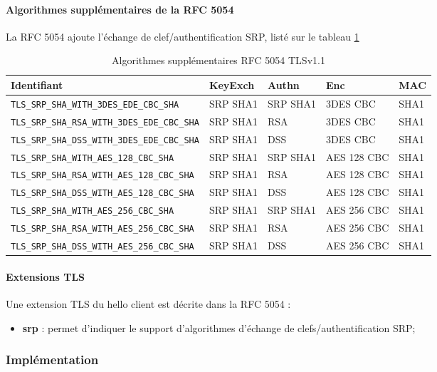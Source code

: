 \paragraph{Algorithmes supplémentaires de la RFC 5054} 
La RFC 5054 \cite{rfc5054} ajoute l'échange de clef/authentification SRP, listé sur le tableau \ref{algosTLS1.1RFC5054}

\begin{table}
\centering
\begin{tabularx}{17cm}{|l|l|l|X|l|}
\hline
\textbf{Identifiant} & \textbf{KeyExch} & \textbf{Authn}& \textbf{Enc}& \textbf{MAC}\\
\hline
\verb+TLS_SRP_SHA_WITH_3DES_EDE_CBC_SHA+&SRP SHA1&SRP SHA1&3DES CBC&SHA1\\
\hline
\verb+TLS_SRP_SHA_RSA_WITH_3DES_EDE_CBC_SHA+&SRP SHA1&RSA&3DES CBC&SHA1\\
\hline
\verb+TLS_SRP_SHA_DSS_WITH_3DES_EDE_CBC_SHA+&SRP SHA1&DSS&3DES CBC&SHA1\\
\hline
\verb+TLS_SRP_SHA_WITH_AES_128_CBC_SHA+&SRP SHA1&SRP SHA1&AES 128 CBC&SHA1\\
\hline
\verb+TLS_SRP_SHA_RSA_WITH_AES_128_CBC_SHA+&SRP SHA1&RSA&AES 128 CBC&SHA1\\
\hline
\verb+TLS_SRP_SHA_DSS_WITH_AES_128_CBC_SHA+&SRP SHA1&DSS&AES 128 CBC&SHA1\\
\hline
\verb+TLS_SRP_SHA_WITH_AES_256_CBC_SHA+&SRP SHA1&SRP SHA1&AES 256 CBC&SHA1\\
\hline
\verb+TLS_SRP_SHA_RSA_WITH_AES_256_CBC_SHA+&SRP SHA1&RSA&AES 256 CBC&SHA1\\
\hline
\verb+TLS_SRP_SHA_DSS_WITH_AES_256_CBC_SHA+&SRP SHA1&DSS&AES 256 CBC&SHA1\\
\hline
\end{tabularx}
\caption{Algorithmes supplémentaires RFC 5054 TLSv1.1}
\label{algosTLS1.1RFC5054}
\end{table}

\paragraph{Extensions TLS}
Une extension TLS du hello client est décrite dans la RFC 5054 :
\begin{itemize}
\item \textbf{srp} : permet d'indiquer le support d'algorithmes d'échange de clefs/authentification SRP;
\end{itemize}

\subsubsection{Implémentation}

